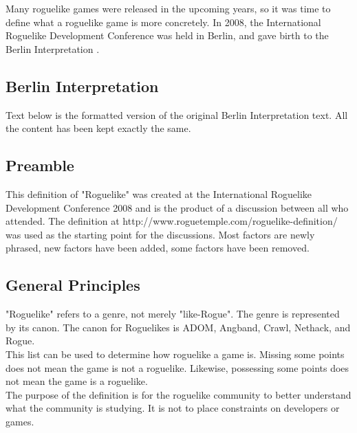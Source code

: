 \documentclass{article}
\begin{document}
Many roguelike games were released in the upcoming years, so it was time to define what a roguelike game is more concretely. In 2008, the International Roguelike Development Conference was held in Berlin, and gave birth to the Berlin Interpretation \cite{berlin}.\\

\subsection{Berlin Interpretation}

Text below is the formatted version of the original Berlin Interpretation text. All the content has been kept exactly the same.

\subsection*{Preamble}

This definition of "Roguelike" was created at the International 
Roguelike Development Conference 2008 and is the product of a 
discussion between all who attended. The definition at 
http://www.roguetemple.com/roguelike-definition/ was used as the 
starting point for the discussions. Most factors are newly phrased, 
new factors have been added, some factors have been removed.

\subsection*{General Principles}
 
"Roguelike" refers to a genre, not merely "like-Rogue". The genre is 
represented by its canon. The canon for Roguelikes is ADOM, Angband, 
Crawl, Nethack, and Rogue.\\
 
This list can be used to determine how roguelike a game is. Missing 
some points does not mean the game is not a roguelike. Likewise, 
possessing some points does not mean the game is a roguelike.\\  
 
The purpose of the definition is for the roguelike community to better 
understand what the community is studying. It is not to place 
constraints on developers or games.\\
\end{document}
